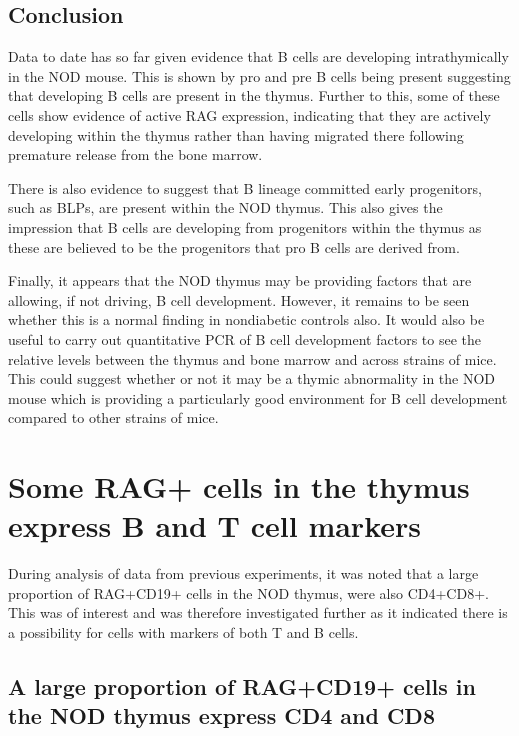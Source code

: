 \subsection{Conclusion}

Data to date has so far given evidence that B cells are developing intrathymically in the NOD mouse.
This is shown by pro and pre B cells being present suggesting that developing B cells are present in the thymus.
Further to this, some of these cells show evidence of active RAG expression, indicating that they are actively developing within the thymus rather than having migrated there following premature release from the bone marrow.

There is also evidence to suggest that B lineage committed early progenitors, such as BLPs, are present within the NOD thymus. 
This also gives the impression that B cells are developing from progenitors within the thymus as these are believed to be the progenitors that pro B cells are derived from.

Finally, it appears that the NOD thymus may be providing factors that are allowing, if not driving, B cell development.
However, it remains to be seen whether this is a normal finding in nondiabetic controls also.
It would also be useful to carry out quantitative PCR of B cell development factors to see the relative levels between the thymus and bone marrow and across strains of mice.
This could suggest whether or not it may be a thymic abnormality in the NOD mouse which is providing a particularly good environment for B cell development compared to other strains of mice.

\section{Some RAG+ cells in the thymus express B and T cell markers}
During analysis of data from previous experiments, it was noted that a large proportion of RAG+CD19+ cells in the NOD thymus, were also CD4+CD8+.
This was of interest and was therefore investigated further as it indicated there is a possibility for cells with markers of both T and B cells.

\subsection{A large proportion of RAG+CD19+ cells in the NOD thymus express CD4 and CD8}

